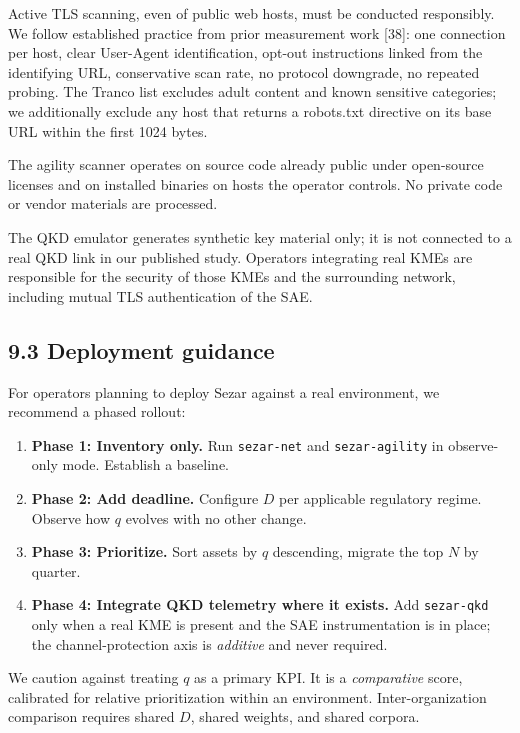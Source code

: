 Active TLS scanning, even of public web hosts, must be conducted
responsibly. We follow established practice from prior measurement work
{[}38{]}: one connection per host, clear User-Agent identification,
opt-out instructions linked from the identifying URL, conservative scan
rate, no protocol downgrade, no repeated probing. The Tranco list
excludes adult content and known sensitive categories; we additionally
exclude any host that returns a robots.txt directive on its base URL
within the first 1024 bytes.

The agility scanner operates on source code already public under
open-source licenses and on installed binaries on hosts the operator
controls. No private code or vendor materials are processed.

The QKD emulator generates synthetic key material only; it is not
connected to a real QKD link in our published study. Operators
integrating real KMEs are responsible for the security of those KMEs and
the surrounding network, including mutual TLS authentication of the SAE.

\subsection{9.3 Deployment guidance}\label{deployment-guidance}

For operators planning to deploy Sezar against a real environment, we
recommend a phased rollout:

\begin{enumerate}
\def\labelenumi{\arabic{enumi}.}
\tightlist
\item
  \textbf{Phase 1: Inventory only.} Run \texttt{sezar-net} and
  \texttt{sezar-agility} in observe-only mode. Establish a baseline.
\item
  \textbf{Phase 2: Add deadline.} Configure \(D\) per applicable
  regulatory regime. Observe how \(q\) evolves with no other change.
\item
  \textbf{Phase 3: Prioritize.} Sort assets by \(q\) descending, migrate
  the top \(N\) by quarter.
\item
  \textbf{Phase 4: Integrate QKD telemetry where it exists.} Add
  \texttt{sezar-qkd} only when a real KME is present and the SAE
  instrumentation is in place; the channel-protection axis is
  \emph{additive} and never required.
\end{enumerate}

We caution against treating \(q\) as a primary KPI. It is a
\emph{comparative} score, calibrated for relative prioritization within
an environment. Inter-organization comparison requires shared \(D\),
shared weights, and shared corpora.

